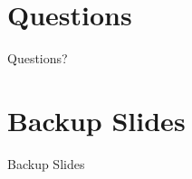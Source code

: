 \documentclass{beamer}
\begin{document}
\section{Questions}
\begin{frame}
\begin{center}
\begin{large}

Questions?
\end{large}
\end{center}
\end{frame}


\section{Backup Slides}
\begin{frame}
\begin{center}
\begin{large}

Backup Slides
\end{large}
\end{center}
\end{frame}
\end{document}
